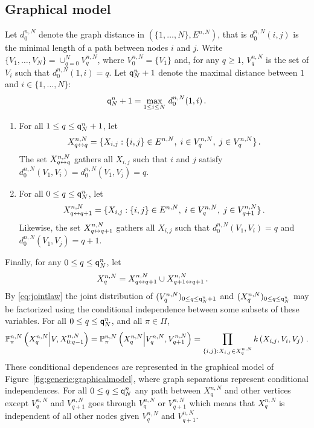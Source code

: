 \subsection{Graphical model}\label{sec:GM}
%
Let $d^{n,N}_0$ denote the graph distance in $(\{1,\ldots,N\},E^{n,N})$, that is $d^{n,N}_0(i,j)$ is the minimal length of a path between nodes $i$ and $j$. Write $\{V_1,\ldots,V_N\}=\cup_{q=0}^{N}V^{n,N}_{q}$, where $V^{n,N}_{0}= \{V_1\}$ and, for any $q\ge 1$, $V^{n,N}_{q}$ is the set of $V_i$ such that $d^{n,N}_0(1,i)=q$. 
Let ${\mathsf{q}}^{n}_{N}+1$ denote the maximal distance between $1$ and $i\in\{1,\ldots,N\}$:
\[
{\mathsf{q}}^{n}_{N}+1 = \max_{1\le i\le N}\,d^{n,N}_0(1,i)\,.
\]
\begin{enumerate}[-]
\item For all $1\le q \le {\mathsf{q}}^{n}_{N}+1$, let 
\[
X^{n,N}_{q\leftrightarrow q}=\{X_{i,j} : \{i,j\}\in E^{n,N},\; i\in V_q^{n,N},\; j\in V_q^{n,N}\}\,.
\]
The set $X^{n,N}_{q\leftrightarrow q}$ gathers all $X_{i,j}$ such that $i$ and $j$ satisfy $d^{n,N}_0(V_1,V_i) = d^{n,N}_0(V_1,V_j)=q$.
\item For all $0\le q \le {\mathsf{q}}^{n}_{N}$, let 
\[
X^{n,N}_{q\leftrightarrow q+1}=\{X_{i,j} : \{i,j\}\in E^{n,N},\; i\in V_q^{n,N},\; j\in V_{q+1}^{n,N}\}\,.
\]
Likewise, the set $X^{n,N}_{q\leftrightarrow q+1}$ gathers all $X_{i,j}$ such that $d^{n,N}_0(V_1,V_i) = q$ and $d^{n,N}_0(V_1,V_j)=q+1$.
\end{enumerate} 
Finally, for any $0\le q \le {\mathsf{q}}^{n}_{N}$, let 
\begin{align*}
X_{q}^{n,N}& = X_{q \leftrightarrow q+1}^{n,N}\cup X_{q+1\leftrightarrow q+1}^{n,N}\,.
\end{align*}
By \eqref{eq:jointlaw} the joint distribution of 
$(V_q^{n,N})_{0\le q\le {\mathsf{q}}^{n}_{N}+1}$ and $(X^{n,N}_{q})_{0\le q \le {\mathsf{q}}^{n}_{N}}$ may be factorized using the conditional independence between some subsets of these variables. For all $0\le q \le {\mathsf{q}}^{n}_{N}$, and all $\pi\in\Pi$,
\[
\mathbb{P}^{n,N}_{\pi}\left(X^{n,N}_{q}\middle| V,X^{n,N}_{0:q-1}\right) = \mathbb{P}^{n,N}_{\pi}\left(X^{n,N}_{q}\middle| V^{n,N}_{q},V^{n,N}_{q+1}\right)=\prod_{\{i,j\} :X_{i,j}\in X^{n,N}_{q}}k\left(X_{i,j},V_i,V_j\right)\,.
\]
These conditional dependences are represented in the graphical model of Figure~\ref{fig:generic:graphicalmodel}, where graph separations represent conditional independences. For all $0\le q \le {\mathsf{q}}^{n}_{N}$ any path between $X^{n,N}_{q}$ and other vertices except $V_q^{n,N}$ and $V_{q+1}^{n,N}$ goes through $V_{q}^{n,N}$ or $V_{q+1}^{n,N}$ which means that $X^{n,N}_{q}$ is independent of all other nodes given $V_q^{n,N}$ and $V_{q+1}^{n,N}$. 

